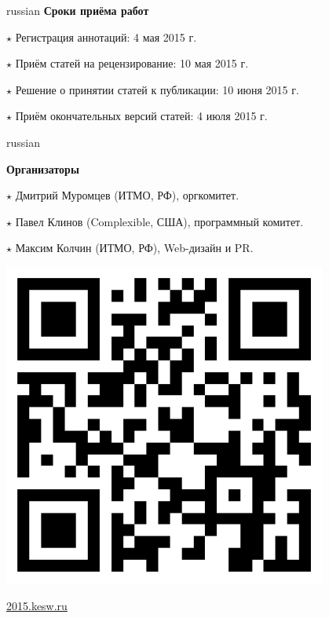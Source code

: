 \documentclass[a4paper, 10pt]{article}
\renewcommand{\skip}{\vspace{1ex}}
\renewcommand{\bullet}{\ensuremath{\star} }
\begin{document}
\begin{otherlanguage*}{russian}
\noindent\textbf{Сроки приёма работ}

\skip

\noindent
\bullet Регистрация аннотаций: 4 мая 2015 г.

\noindent
\bullet Приём статей на рецензирование: 10 мая 2015 г.

\noindent
\bullet Решение о принятии статей к публикации: 10 июня 2015 г.

\noindent
\bullet Приём окончательных версий статей: 4 июля 2015 г.

\skip

\hspace*{-\parindent}%
\begin{minipage}{.80\textwidth}
\begin{otherlanguage*}{russian}

\textbf{Организаторы}

\skip

\noindent
\bullet Дмитрий Муромцев (ИТМО, РФ), оргкомитет.

\bullet Павел Клинов (Complexible, США), программный комитет.

\bullet Максим Колчин (ИТМО, РФ), Web-дизайн и PR.

\end{otherlanguage*}
\end{minipage}
\begin{minipage}{.20\textwidth}
\includegraphics[width=0.8\textwidth]{qrcode}

\footnotesize{\url{2015.kesw.ru}}
\end{minipage}
\hfill



\end{otherlanguage*}
\end{document}
